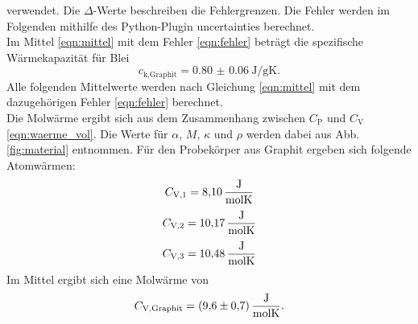 verwendet. Die $\Delta$-Werte beschreiben die Fehlergrenzen.
Die Fehler werden im Folgenden mithilfe des Python-Plugin uncertainties \cite{uncertainties} berechnet.
\\
Im Mittel \eqref{eqn:mittel} mit dem Fehler \eqref{eqn:fehler} beträgt die spezifische Wärmekapazität für Blei
\begin{equation}
    c_\text{k,Graphit} = \SI{0.80(6)}{\joule/\gram\kelvin} .
\end{equation}
Alle folgenden Mittelwerte werden nach Gleichung \eqref{eqn:mittel} mit dem dazugehörigen Fehler \eqref{eqn:fehler} berechnet.
\\
Die Molwärme ergibt sich aus dem Zusammenhang zwischen $C_\text{P}$ und $C_\text{V}$ \eqref{eqn:waerme_vol}.
Die Werte für $\alpha$, $M$, $\kappa$ und $\rho$ werden dabei aus Abb. \ref{fig:material} entnommen.
Für den Probekörper aus Graphit ergeben sich folgende Atomwärmen:
\begin{equation*}
    C_\text{V,1} = \SI{8.10}{\frac{\joule}{\mol\kelvin}}
\end{equation*}
\begin{equation*}
    C_\text{V,2} = \SI{10.17}{\frac{\joule}{\mol\kelvin}}
\end{equation*}
\begin{equation*}
    C_\text{V,3} = \SI{10.48}{\frac{\joule}{\mol\kelvin}}
\end{equation*}
Im Mittel ergibt sich eine Molwärme von
\begin{equation}
    C_\text{V,Graphit} = \SI{9.6(7)}{\frac{\joule}{\mol\kelvin}} .
\end{equation}

